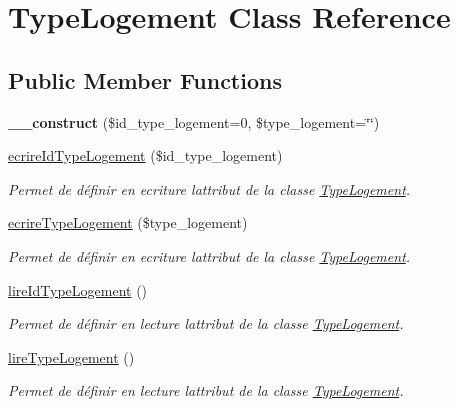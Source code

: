 \hypertarget{class_type_logement}{}\section{Type\+Logement Class Reference}
\label{class_type_logement}
\subsection*{Public Member Functions}
\begin{DoxyCompactItemize}
\item 
\mbox{\label{class_type_logement_a88ba80acf13c6e81abda4d7f4afed058}} 
{\bfseries \+\_\+\+\_\+construct} (\$id\+\_\+type\+\_\+logement=0, \$type\+\_\+logement=\char`\"{}\char`\"{})
\item 
\hyperlink{class_type_logement_a3a9b66cd5946223b48e7f4dd5697f36a}{ecrire\+Id\+Type\+Logement} (\$id\+\_\+type\+\_\+logement)
\begin{DoxyCompactList}\small\item\em Permet de définir en ecriture l\textquotesingle{}attribut de la classe \hyperlink{class_type_logement}{Type\+Logement}. \end{DoxyCompactList}\item 
\hyperlink{class_type_logement_aebc6c44c0bedae48c034d3ca01b753d7}{ecrire\+Type\+Logement} (\$type\+\_\+logement)
\begin{DoxyCompactList}\small\item\em Permet de définir en ecriture l\textquotesingle{}attribut de la classe \hyperlink{class_type_logement}{Type\+Logement}. \end{DoxyCompactList}\item 
\hyperlink{class_type_logement_aeccc67026d51459dabd97d6267382d1a}{lire\+Id\+Type\+Logement} ()
\begin{DoxyCompactList}\small\item\em Permet de définir en lecture l\textquotesingle{}attribut de la classe \hyperlink{class_type_logement}{Type\+Logement}. \end{DoxyCompactList}\item 
\hyperlink{class_type_logement_ae03a0087b23deebdbcd5298e8c69082e}{lire\+Type\+Logement} ()
\begin{DoxyCompactList}\small\item\em Permet de définir en lecture l\textquotesingle{}attribut de la classe \hyperlink{class_type_logement}{Type\+Logement}. \end{DoxyCompactList}\end{DoxyCompactItemize}


